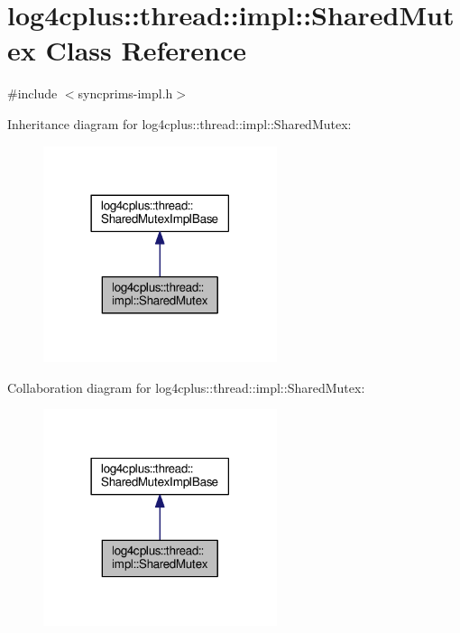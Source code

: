 \hypertarget{classlog4cplus_1_1thread_1_1impl_1_1SharedMutex}{\section{log4cplus\-:\-:thread\-:\-:impl\-:\-:Shared\-Mutex Class Reference}
\label{classlog4cplus_1_1thread_1_1impl_1_1SharedMutex}
}


{\ttfamily \#include $<$syncprims-\/impl.\-h$>$}



Inheritance diagram for log4cplus\-:\-:thread\-:\-:impl\-:\-:Shared\-Mutex\-:
\nopagebreak
\begin{figure}[H]
\begin{center}
\leavevmode
\includegraphics[width=194pt]{classlog4cplus_1_1thread_1_1impl_1_1SharedMutex__inherit__graph}
\end{center}
\end{figure}


Collaboration diagram for log4cplus\-:\-:thread\-:\-:impl\-:\-:Shared\-Mutex\-:
\nopagebreak
\begin{figure}[H]
\begin{center}
\leavevmode
\includegraphics[width=194pt]{classlog4cplus_1_1thread_1_1impl_1_1SharedMutex__coll__graph}
\end{center}
\end{figure}
